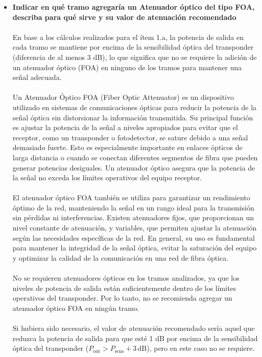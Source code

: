 \begin{itemize}
\item \textbf{Indicar en qué tramo agregaría un Atenuador óptico del tipo FOA, describa para qué sirve y su valor de atenuación recomendado}\\\\
En base a los cálculos realizados para el ítem 1.a, la potencia de salida en cada tramo se mantiene por encima de la sensibilidad óptica del transponder (diferencia de al menos 3 dB), lo que significa que no se requiere la adición de un atenuador óptico (FOA) en ninguno de los tramos para mantener una señal adecuada.\\\\
Un Atenuador Óptico FOA (Fiber Optic Attenuator) es un dispositivo utilizado en sistemas de comunicaciones ópticas para reducir la potencia de la señal óptica sin distorsionar la información transmitida. Su principal función es ajustar la potencia de la señal a niveles apropiados para evitar que el receptor, como un transponder o fotodetector, se sature debido a una señal demasiado fuerte. Esto es especialmente importante en enlaces ópticos de larga distancia o cuando se conectan diferentes segmentos de fibra que pueden generar potencias desiguales. Un atenuador óptico asegura que la potencia de la señal no exceda los límites operativos del equipo receptor.\\\\
El atenuador óptico FOA también se utiliza para garantizar un rendimiento óptimo de la red, manteniendo la señal en un rango ideal para la transmisión sin pérdidas ni interferencias. Existen atenuadores fijos, que proporcionan un nivel constante de atenuación, y variables, que permiten ajustar la atenuación según las necesidades específicas de la red. En general, su uso es fundamental para mantener la integridad de la señal óptica, evitar la saturación del equipo y optimizar la calidad de la comunicación en una red de fibra óptica.\\\\
No se requieren atenuadores ópticos en los tramos analizados, ya que los niveles de potencia de salida están suficientemente dentro de los límites operativos del transponder. Por lo tanto, no se recomienda agregar un atenuador óptico FOA en ningún tramo.\\\\
Si hubiera sido necesario, el valor de atenuación recomendado sería aquel que reduzca la potencia de salida para que esté 1 dB por encima de la sensibilidad óptica del transponder ($P_{\text{out}} > P_{\text{sens}} + 3 \, \text{dB}$), pero en este caso no se requiere.

\end{itemize}
